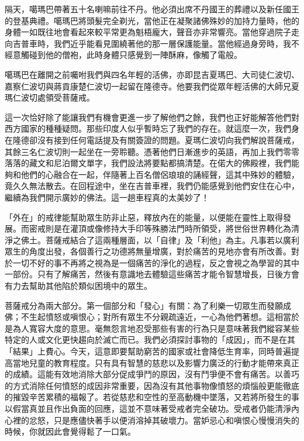
隔天，噶瑪巴帶著五十名喇嘛前往不丹。他必須出席不丹國王的葬禮以及新任國王的登基典禮。噶瑪巴將頭髮完全剃光，當他正在凝聚諸佛殊妙的加持力量時，他的身體一如既往地會看起來較平常更為魁梧龐大，聲音亦非常響亮。當他穿過院子走向吉普車時，我們近乎能看見圍繞著他的那一層保護能量。當他經過身旁時，我不經意觸碰到他的僧袍，此時身體只感覺到一陣酥麻，像觸了電般。

噶瑪巴在離開之前囑咐我們與四名年輕的活佛，亦即昆吉夏瑪巴、大司徒仁波切、嘉察仁波切與蔣貢康楚仁波切一起留在隆德寺。他要我們從眾年輕活佛的大師兄夏瑪仁波切處領受菩薩戒。

這一次恰好除了能讓我們有機會更進一步了解他們之餘，我們也正好能解答他們對西方國家的種種疑問。那些印度人似乎暫時忘了我們的存在。就這麼一次，我們身在隆德卻沒有接到任何電話提及有關簽證的問題。夏瑪仁波切向我們解說菩薩戒，其餘三名仁波切則一起坐在一旁聆聽。憑著他們日漸進步的英語，再加上我們零零落落的藏文和尼泊爾文單字，我們設法將要點都搞清楚。在偌大的佛殿裡，我們能夠和他們的心融合在一起，伴隨著上百名僧侶琅琅的誦經聲，這其中殊妙的體驗，竟久久無法散去。在回程途中，坐在吉普車裡，我們仍能感覺到他們安住在心中，繼續為我們開示廣妙的佛法。這一趟車程真的太美妙了！

「外在」的戒律能幫助眾生防非止惡，釋放內在的能量，以便能在靈性上取得發展。而密戒則是在灌頂或像修持大手印等殊勝法門時所領受，將世俗世界轉化為清淨之佛土。菩薩戒結合了這兩種層面，以「自律」及「利他」為主。凡事若以廣利眾生的角度出發，各個善行之功德將無量增廣，對於痛苦的見地亦會有所改善。對於一切不好的事不再將之視為是一個痛苦的淨化的過程，反之會視之為學習的其中一部份。只有了解痛苦，然後有意識地去體驗這些痛苦才能令智慧增長，日後方會有力去幫助其他陷於類似困境中的眾生。

菩薩戒分為兩大部分。第一個部分和「發心」有關：為了利樂一切眾生而發願成佛；不生起憤怒或嗔恨心；對所有眾生不分親疏遠近，一心為他們著想。這相當於是為人寬容大度的意思。毫無怨言地忍受那些有害的行為只是意味著我們縱容某些特定的人或文化更快趨向於滅亡而已。我們必須探討事物的「成因」，而不是在其「結果」上費心。今天，這意即要幫助窮苦的國家或社會降低生育率，同時普遍提高當地兒童的教育程度。只有具有智慧的慈悲以及影響力廣泛的行動才能帶來真正的成績。這能有效地消除大部分促成爭鬥的原因，沒有鬥爭便不會有痛苦。以善巧的方式消除任何憤怒的成因非常重要，因為沒有其他事物像憤怒的煩惱般更能徹底的摧毀辛苦累積的福報了。若從慈悲和空性的至高動機中墜落，又若將所發生的事以假當真並且作出負面的回應，這並不意味著受戒者完全破功。受戒者仍能清淨內心裡的忿怒，只是應儘快著手以便消溶掉其破壞力。當妒忌心和嗔恨心慢慢消失的時候，你就因此會覺得鬆了一口氣。

